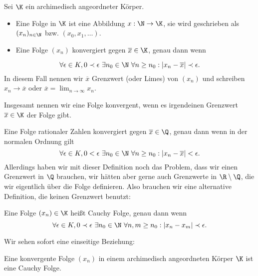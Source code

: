 \documentclass[letterpaper,10pt,english]{jupyterBook}
\begin{document}
\begin{emphBox}{}{}
\begin{definition}{}{}
Sei \(\K\) ein archimedisch angeordneter Körper.
\begin{itemize}
\item {} 
Eine Folge in \(\K\) ist eine Abbildung \(x: \N \rightarrow \K\), sie wird geschrieben als \((x_n)_{n \in \N}\) bzw.
\((x_0,x_1,\ldots)\).

\item {} 
Eine Folge \((x_n)\) konvergiert gegen \(\overline{x} \in \K\), genau dann wenn

\end{itemize}
\begin{equation*}
 \forall \epsilon \in K, 0 \prec \epsilon ~ \exists n_0 \in \N ~\forall n \geq n_0: |x_n - \overline{x}| \prec \epsilon.
\end{equation*}
In diesem Fall nennen wir \(\overline{x}\) Grenzwert (oder Limes) von \((x_n)\) und schreiben \(x_n \rightarrow \overline{x}\) oder \(\overline{x}= \lim_{n \rightarrow \infty} x_n. \)

Insgesamt nennen wir eine Folge konvergent, wenn es irgendeinen Grenzwert \(\overline{x} \in \K\) der Folge gibt.
\end{definition}
\end{emphBox}

Eine Folge rationaler Zahlen konvergiert gegen \(\overline{x} \in \Q\), genau dann wenn in der normalen Ordnung gilt
\begin{equation*}
 \forall \epsilon \in K, 0 < \epsilon ~ \exists n_0 \in \N ~\forall n \geq n_0: |x_n - \overline{x}| < \epsilon.
\end{equation*}
Allerdings haben wir mit dieser Definition noch das Problem, dass wir einen Grenzwert in \(\Q\) brauchen, wir hätten aber gerne auch Grenzwerte in \(\R \setminus \Q\), die wir eigentlich über die Folge definieren. Also brauchen wir eine alternative Definition, die keinen Grenzwert benutzt:
\label{grundlagen/zahlensysteme:definition-14}
\begin{definition}{}{}



Eine Folge \((x_n) \in \K\) heißt Cauchy Folge, genau dann wenn
\begin{equation*}
 \forall \epsilon \in K, 0 \prec \epsilon ~ \exists n_0 \in \N ~\forall n,m  \geq n_0: |x_n - x_m| \prec \epsilon.
\end{equation*}\end{definition}

Wir sehen sofort eine einseitige Beziehung:
\label{grundlagen/zahlensysteme:theorem-15}
\begin{theorem}{}{}



Eine konvergente Folge \((x_n)\) in einem archimedisch angeordneten Körper \(\K\) ist eine Cauchy Folge.
\end{theorem}
\end{document}
